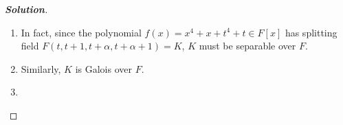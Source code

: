 \documentclass[12pt,leqno]{article}
\theoremstyle{definition}
\newcommand{\+}{\oplus}
\newenvironment{Solution}{\begin{proof}[\textnormal{\textbf{Solution}}]}{\end{proof}}
\begin{document}
\begin{enumerate}
\begin{Solution}
\begin{enumerate}
	\item In fact, since the polynomial $f(x)=x^4+x+t^4+t\in F[x]$ has splitting field $F(t,t+1,t+\alpha,t+\alpha+1)=K$, $K$ must be separable over $F$.
	\item Similarly, $K$ is Galois over $F$.
	\item 
\end{enumerate}
	\end{Solution}
  \end{enumerate}
\end{document}
